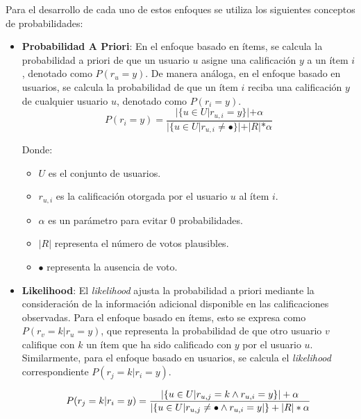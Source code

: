 \documentclass[runningheads,a4paper]{llncs}
\begin{document}
Para el desarrollo de cada uno de estos enfoques se 
utiliza los siguientes conceptos de probabilidades:

\begin{itemize}
    \item \textbf{Probabilidad A Priori}: 
    En el enfoque basado en ítems, se calcula la 
    probabilidad a priori de que un usuario $u$ asigne 
    una calificación $y$ a un ítem $i$, 
    denotado como $P(r_u = y)$. De manera análoga, 
    en el enfoque basado en usuarios, se calcula la 
    probabilidad de que un ítem $i$ reciba una 
    calificación $y$ de cualquier usuario $u$, 
    denotado como $P (r_i = y)$.\\

    \begin{equation}
        P(r_i = y) = \frac{|\{u \in U|r_{u,i} = y\}| + \alpha}{|\{u \in U|r_{u,i} \neq \bullet\}| + |R|*\alpha}
    \end{equation} \cite{tesis_sistema_recomendador_hibrido}

    Donde:
    \begin{itemize}
        \item $U$ es el conjunto de usuarios.
        \item $r_{u,i}$ es la calificación otorgada por el usuario $u$ al ítem $i$.
        \item $\alpha$ es un parámetro para evitar 0 probabilidades.
        \item $|R|$ representa el número de votos plausibles.
        \item $\bullet$ representa la ausencia de voto.
    \end{itemize} 

    
    \item \textbf{Likelihood}: 
    El \textit{likelihood} ajusta la probabilidad a 
    priori mediante la consideración de la 
    información adicional disponible en las 
    calificaciones observadas. Para el enfoque basado 
    en ítems, esto se expresa como 
    $P(r_v = k | r_u = y)$, que representa la 
    probabilidad de que otro usuario $v$ califique 
    con $k$ un ítem que ha sido calificado con $y$ 
    por el usuario $u$. Similarmente, para el enfoque 
    basado en usuarios, se calcula el \textit{likelihood} 
    correspondiente $P(r_j = k|r_i = y)$.

    \begin{equation}
        P(r_j = k|r_i = y) =  \\ \frac{|\{u \in U|r_{u,j} = k  \land  r_{u,i} = y\}|+ \alpha}{|\{u \in U|r_{u,j} \neq \bullet \land r_{u,i} = y|\} + |R|*\alpha}
    \end{equation} \cite{tesis_sistema_recomendador_hibrido}



\end{itemize}
\end{document}
